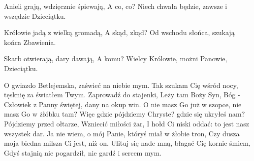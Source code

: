 \beginverse
Anieli grają, wdzięcznie śpiewają,
A co, co?
\endverse
\beginchorus
Niech chwała będzie, zawsze i wszędzie
Dzieciątku.
\endchorus

\beginverse
Królowie jadą z wielką gromadą,
A skąd, zkąd?
\endverse
\beginchorus
Od wschodu słońca, szukają końca
Zbawienia.
\endchorus

\beginverse
Skarb otwierają, dary dawają,
A komu?
\endverse
\beginchorus
Wielcy Królowie, możni Panowie,
Dzieciątku.
\endchorus
\endsong

\beginverse
O gwiazdo Betlejemska,
zaświeć na niebie mym.
Tak szukam Cię wśród nocy,
tęsknię za światłem Twym.
\endverse
\beginchorus
Zaprowadź do stajenki,
Leży tam Boży Syn,
Bóg - Człowiek z Panny świętej,
dany na okup win.
\endchorus
\beginverse
O nie masz Go już w szopce,
nie masz Go w żłóbku tam?
Więc gdzie pójdziemy Chryste?
gdzie się ukryłeś nam?
\endverse
\beginchorus
Pójdziemy przed ołtarze,
Wzniecić miłości żar,
I hołd Ci niski oddać:
to jest nasz wszystek dar.
\endchorus
\beginverse
Ja nie wiem, o mój Panie,
któryś miał w żłobie tron,
Czy dusza moja biedna
milsza Ci jest, niż on.
\endverse
\beginchorus
Ulituj się nade mną, błagać Cię
kornie śmiem,
Gdyś stajnią nie pogardził,
nie gardź i sercem mym.
\endchorus
\endsong


